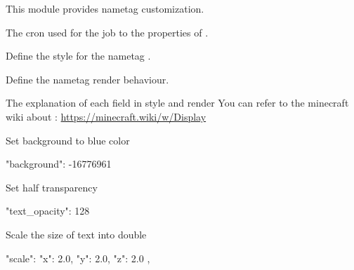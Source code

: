 This module provides nametag customization.

\begin{Configuration}
    \item[update\_cron]{
        The cron used for the job to  the properties of .
    }

    \item[style]{
        Define the style for the nametag .
    }

    \item[render]{
        Define the nametag render behaviour.
        \begin{note}{The explanation of each field in style and render}
            You can refer to the minecraft wiki about : \url{https://minecraft.wiki/w/Display}
        \end{note}
    }
\end{Configuration}

\begin{example}{Set background to blue color}
    \begin{json}
        "background": -16776961
    \end{json}
\end{example}

\begin{example}{Set half transparency}
    \begin{json}
        "text_opacity": 128
    \end{json}
\end{example}

\begin{example}{Scale the size of text into double}
    \begin{json}
        "scale": {
            "x": 2.0,
            "y": 2.0,
            "z": 2.0
        },
    \end{json}

\end{example}
